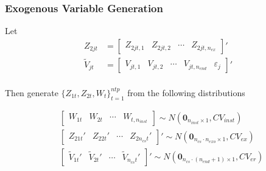 \documentclass[9pt]{beamer}
\begin{document}
\begin{frame} 
\frametitle{Exogenous Variable Generation} 

Let 
$$ 
\begin{align*} 
Z_{2jt} &= \begin{bmatrix} Z_{2jt,1} & Z_{2jt,2} & \cdots & Z_{2jt,n_{ex}} \end{bmatrix}' \\[10pt]  
\tilde{V}_{jt} &= \begin{bmatrix} V_{jt,1} & V_{jt,2}& \cdots & V_{jt,n_{end}} & \varepsilon_{j} \end{bmatrix}' \\[10pt]
\end{align*} 
$$

Then generate $\{Z_{1t},Z_{2t},W_t\}_{t=1}^{ntp}$ from the following distributions

\begin{align*}
& \begin{bmatrix} W_{1t} & W_{2t}& \cdots & W_{t,n_{inst}} \end{bmatrix} \sim N(\mathbf{0}_{n_{inst} \times 1}, CV_{inst}) \\[10pt]
%
&\begin{bmatrix} Z_{21t}' & Z_{22t}' & \cdots & Z_{2n_{cs}t}' \end{bmatrix}' \sim N(\mathbf{0}_{n_{cs} \cdot n_{exo} \times 1}, CV_{ex}) \\[10pt]
%
&\begin{bmatrix} \tilde{V}_{1t}' & \tilde{V}_{2t}' & \cdots & \tilde{V}_{n_{cs}t}' \end{bmatrix}' \sim N(\mathbf{0}_{n_{cs} \cdot (n_{end} +1) \times 1}, CV_{er})
\end{align*}
\end{frame}
\end{document}
